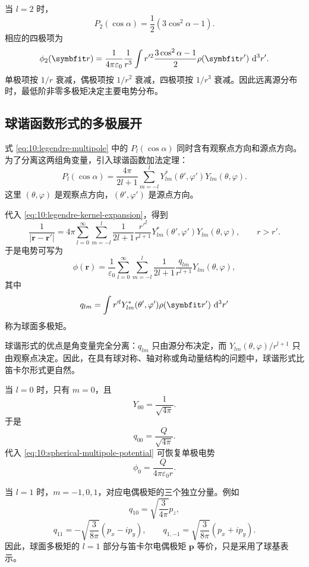 当 $l=2$ 时，
\[
P_{2}(\cos\alpha)
=
\frac{1}{2}(3\cos^{2}\alpha-1).
\]
相应的四极项为
\[
\phi_{2}(\bm{r})
=
\frac{1}{4\pi\varepsilon_{0}}
\frac{1}{r^{3}}
\int
r'^{2}
\frac{3\cos^{2}\alpha-1}{2}
\rho(\bm{r}')
\,\dif^{3}r'.
\]
单极项按 $1/r$ 衰减，偶极项按 $1/r^{2}$ 衰减，四极项按 $1/r^{3}$ 衰减。因此远离源分布时，最低阶非零多极矩决定主要电势分布。

\subsection{球谐函数形式的多极展开}

式 \eqref{eq:10:legendre-multipole} 中的 $P_{l}(\cos\alpha)$ 同时含有观察点方向和源点方向。为了分离这两组角变量，引入球谐函数加法定理：
\[
P_{l}(\cos\alpha)
=
\frac{4\pi}{2l+1}
\sum_{m=-l}^{l}
Y_{lm}^{*}(\theta',\varphi')
Y_{lm}(\theta,\varphi).
\]
这里 $(\theta,\varphi)$ 是观察点方向，$(\theta',\varphi')$ 是源点方向。

代入 \eqref{eq:10:legendre-kernel-expansion}，得到
\[
\frac{1}{|\bm{r}-\bm{r}'|}
=
4\pi
\sum_{l=0}^{\infty}
\sum_{m=-l}^{l}
\frac{1}{2l+1}
\frac{r'^{l}}{r^{l+1}}
Y_{lm}^{*}(\theta',\varphi')
Y_{lm}(\theta,\varphi),
\qquad r>r'.
\]
于是电势可写为
\begin{equation}
	\phi(\bm{r})
	=
	\frac{1}{\varepsilon_{0}}
	\sum_{l=0}^{\infty}
	\sum_{m=-l}^{l}
	\frac{1}{2l+1}
	\frac{q_{lm}}{r^{l+1}}
	Y_{lm}(\theta,\varphi),
	\label{eq:10:spherical-multipole-potential}
\end{equation}
其中
\begin{equation}
	q_{lm}
	=
	\int
	r'^{l}
	Y_{lm}^{*}(\theta',\varphi')
	\rho(\bm{r}')
	\,\dif^{3}r'
	\label{eq:10:spherical-multipole-moment}
\end{equation}
称为球面多极矩。

球谐形式的优点是角变量完全分离：$q_{lm}$ 只由源分布决定，而 $Y_{lm}(\theta,\varphi)/r^{l+1}$ 只由观察点决定。因此，在具有球对称、轴对称或角动量结构的问题中，球谐形式比笛卡尔形式更自然。

当 $l=0$ 时，只有 $m=0$，且
\[
Y_{00}
=
\frac{1}{\sqrt{4\pi}}.
\]
于是
\[
q_{00}
=
\frac{Q}{\sqrt{4\pi}}.
\]
代入 \eqref{eq:10:spherical-multipole-potential} 可恢复单极电势
\[
\phi_{0}
=
\frac{Q}{4\pi\varepsilon_{0}r}.
\]

当 $l=1$ 时，$m=-1,0,1$，对应电偶极矩的三个独立分量。例如
\[
q_{10}
=
\sqrt{\frac{3}{4\pi}}p_{z},
\]
\[
q_{11}
=
-\sqrt{\frac{3}{8\pi}}(p_{x}-ip_{y}),
\qquad
q_{1,-1}
=
\sqrt{\frac{3}{8\pi}}(p_{x}+ip_{y}).
\]
因此，球面多极矩的 $l=1$ 部分与笛卡尔电偶极矩 $\bm{p}$ 等价，只是采用了球基表示。

